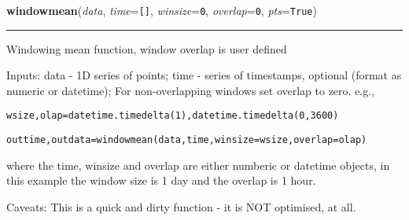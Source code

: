 \hspace{.8\funcindent}\begin{boxedminipage}{\funcwidth}

    \raggedright \textbf{windowmean}(\textit{data}, \textit{time}={\tt \texttt{[}\texttt{]}}, \textit{winsize}={\tt 0}, \textit{overlap}={\tt 0}, \textit{pts}={\tt True})

    \vspace{-1.5ex}

    \rule{\textwidth}{0.5\fboxrule}
\setlength{\parskip}{2ex}
    Windowing mean function, window overlap is user defined

    Inputs: data - 1D series of points; time - series of timestamps, 
    optional (format as numeric or datetime); For non-overlapping windows 
    set overlap to zero. e.g.,

\begin{alltt}
\pysrcprompt{{\textgreater}{\textgreater}{\textgreater} }wsize, olap = datetime.timedelta(1), datetime.timedelta(0,3600)\end{alltt}
\begin{alltt}
\pysrcprompt{{\textgreater}{\textgreater}{\textgreater} }outtime, outdata = windowmean(data, time, winsize=wsize, overlap=olap)\end{alltt}
    where the time, winsize and overlap are either numberic or datetime 
    objects, in this example the window size is 1 day and the overlap is 1 
    hour.

    Caveats: This is a quick and dirty function - it is NOT optimised, at 
    all.

\setlength{\parskip}{1ex}
    \end{boxedminipage}

    \label{spacepy:utils:medabsdev}

    \vspace{0.5ex}

